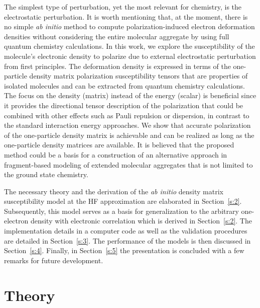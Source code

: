 \documentclass[aip,jcp,preprint,amsmath,amssymb,floatfix]{revtex4-1}
\begin{document}
The simplest type of perturbation, yet the most relevant for chemistry, is the electrostatic perturbation.
It is worth mentioning that, at the moment, there is no simple \emph{ab initio} method to compute 
polarization\hyp{}induced electron deformation densities without considering the entire molecular 
aggregate by using full quantum chemistry calculations.\cite{
Ma.Politzer.JCP.2004,
Horn.Head-Gordon.JCP.2015,
Mandado.Hermida-Ramon.JCTC.2011}
In this work, we explore the susceptibility of the molecule's electronic density
to polarize due to external electrostatic perturbation from first principles. 
The deformation density is expressed in terms
of the one\hyp{}particle density matrix polarization susceptibility tensors 
that are properties of isolated molecules and can be
extracted from quantum chemistry calculations. The focus on the density (matrix) instead of the energy
(scalar) is beneficial since it provides the directional tensor description
of the polarization that could be combined with other effects such as Pauli repulsion 
or dispersion,\cite{Mandado.Hermida-Ramon.JCTC.2011}
in contrast to the standard interaction energy approaches. We show that accurate polarization 
of the one\hyp{}particle density
matrix is achievable and can be realized as long as the one\hyp{}particle density matrices
are available. It is believed that the proposed method
could be a basis for a construction of an 
alternative approach in fragment\hyp{}based
modeling of extended molecular aggregates that is not limited to the ground state chemistry.

The necessary theory and the derivation of the \emph{ab initio} density matrix susceptibility model
at the HF approximation\cite{Roothaan.RevModPhys.1951} are elaborated
in Section~\ref{s:2}. Subsequently, this model serves as a basis for generalization to the 
arbitrary one\hyp{}electron density with electronic correlation which is derived in Section~\ref{s:2}. 
The implementation details in a computer code as well as the validation procedures are detailed
in Section~\ref{s:3}. The performance of the models is then discussed in Section~\ref{s:4}.
Finally, in Section~\ref{s:5} the presentation is concluded with a few 
remarks for future development.

\section{\label{s:2}Theory}
\end{document}
